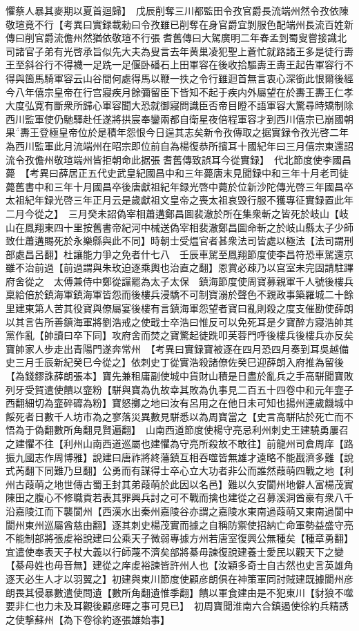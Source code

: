 懼蔡人暴其麥期以夏首迴歸】　戊辰削奪三川都監田令孜官爵長流端州然令孜依陳敬瑄竟不行【考異曰實録載勑曰令孜雖已削奪在身官爵宜剝服色配端州長流百姓新傳曰削官爵流儋州然猶依敬瑄不行張耆舊傳曰大駕廣明二年春孟到蜀叟嘗接識北司諸官子弟有光啓承旨似先大夫為叟言去年黄巢凌犯聖上蒼忙就路諸王多是徒行夀王至斜谷行不得襪一足跣一足偃卧磻石上田軍容在後收拾驅夀王夀王起告軍容行不得與箇馬騎軍容云山谷間何處得馬以鞭一抶之令行雖迴首無言衷心深銜此恨爾後經今八年僖宗皇帝在行宫寢疾月餘彌留臣下皆知不起于疾内外屬望在於夀王夀王仁孝大度弘寛有斷衆所歸心軍容聞大恐就御寢問識臣否帝目瞪不語軍容大驚尋時矯制除西川監軍使仍馳驛赴任遂將拱宸奉鑾兩都自衛星夜倍程軍容才到西川僖宗已崩國朝果夀王登極皇帝位於是積年怨恨今日逞其志矣新令孜傳取之据實録令孜光啓二年為西川監軍此月流端州在昭宗即位前自為楊復恭所擯耳十國紀年曰三月僖宗東還詔流令孜儋州敬瑄端州皆拒朝命此据張耆舊傳致誤耳今從實録】　代北節度使李國昌薨　【考異曰薛居正五代史武皇紀國昌中和三年薨唐末見聞録中和三年十月老司徒薨舊書中和三年十月國昌卒後唐獻祖紀年録光啓中薨於位新沙陀傳光啓三年國昌卒太祖紀年録光啓三年正月云是歲獻祖文皇帝之喪太祖哀毁行服不獲專征實録置此年二月今從之】　三月癸未詔偽宰相蕭遘鄭昌圖裴澈於所在集衆斬之皆死於岐山【岐山在鳳翔東四十里按舊書帝紀河中械送偽宰相裴澈鄭昌圖命斬之於岐山縣太子少師致仕蕭遘賜死於永樂縣與此不同】時朝士受煴官者甚衆法司皆處以極法【法司謂刑部處昌呂翻】杜讓能力爭之免者什七八　壬辰車駕至鳳翔節度使李昌符恐車駕還京雖不治前過【前過謂與朱玫迫逐乘輿也治直之翻】恩賞必疎乃以宫室未完固請駐蹕府舍從之　太傅兼侍中鄭從讜罷為太子太保　鎮海節度使周寶募親軍千人號後樓兵稟給倍於鎮海軍鎮海軍皆怨而後樓兵浸驕不可制寶溺於聲色不親政事築羅城二十餘里建東第人苦其役寶與僚屬宴後樓有言鎮海軍怨望者寶曰亂則殺之度支催勘使薛朗以其言告所善鎮海軍將劉浩戒之使戢士卒浩曰惟反可以免死耳是夕寶醉方寢浩帥其黨作亂【帥讀曰卒下同】攻府舍而焚之寶驚起徒跣叩芙蓉門呼後樓兵後樓兵亦反矣寶帥家人步走出青陽門遂奔常州　【考異曰實録寶被逐在四月恐四月奏到耳吳越備史三月壬辰新紀癸巳今從之】依刺史丁從實浩殺諸僚佐癸巳迎薛朗入府推為留後【為錢鏐誅薛朗張本】寶先兼租庸副使城中貨財山積是日盡於亂兵之手高駢聞寶敗列牙受賀遣使饋以韲粉【駢與寶為仇故幸其敗為仇事見二百五十四卷中和元年韲子西翻細切為韲碎䃺為粉】寶怒擲之地曰汝有呂用之在他日未可知也揚州連歲饑城中餒死者日數千人坊市為之寥落災異數見駢悉以為周寶當之【史言高駢阽於死亡而不悟為于偽翻數所角翻見賢遍翻】　山南西道節度使楊守亮忌利州刺史王建驍勇屢召之建懼不往【利州山南西道巡屬也建懼為守亮所殺故不敢往】前龍州司倉周庠【路振九國志作周博雅】說建曰唐祚將終藩鎮互相吞噬皆無雄才遠略不能戡濟多難【說式芮翻下同難乃旦翻】公勇而有謀得士卒心立大功者非公而誰然葭萌四戰之地【利州古葭萌之地世傳古蜀王封其弟葭萌於此因以名邑】難以久安閬州地僻人富楊茂實陳田之腹心不修職貢若表其罪興兵討之可不戰而擒也建從之召募溪洞酋豪有衆八千沿嘉陵江而下襲閬州【西漢水出秦州嘉陵谷亦謂之嘉陵水東南過葭萌又東南過閬中閬州東州巡屬酋慈由翻】逐其刺史楊茂實而據之自稱防禦使招納亡命軍勢益盛守亮不能制部將張䖍裕說建曰公乘天子微弱專據方州若唐室復興公無種矣【種章勇翻】宜遣使奉表天子杖大義以行師蔑不濟矣部將綦毋諫復說建養士愛民以觀天下之變【綦母姓也毋音無】建從之庠䖍裕諫皆許州人也【汝穎多奇士自古然也史言英雄角逐天必生人才以羽翼之】初建與東川節度使顧彦朗俱在神策軍同討賊建既據閬州彦朗畏其侵暴數遣使問遺【數所角翻遺惟季翻】饋以軍食建由是不犯東川【豺狼不噬要非仁也力未及耳觀後顧彦暉之事可見已】　初周寶聞淮南六合鎮遏使徐約兵精誘之使撃蘇州【為下卷徐約逐張雄始事】

